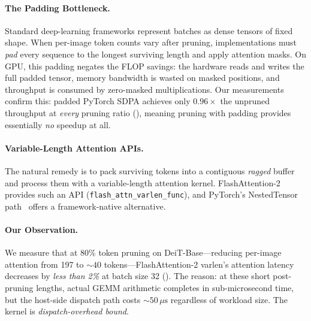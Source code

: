 \documentclass[conference]{IEEEtran}
\newcommand{\us}{\,\mu\text{s}}
\begin{document}
\paragraph{The Padding Bottleneck.}
Standard deep-learning frameworks represent batches as dense tensors
of fixed shape.
When per-image token counts vary after pruning, implementations must
\emph{pad} every sequence to the longest surviving length and apply
attention masks.
On GPU, this padding negates the FLOP savings: the hardware reads and
writes the full padded tensor, memory bandwidth is wasted on masked
positions, and throughput is consumed by zero-masked multiplications.
Our measurements confirm this: padded PyTorch SDPA achieves only
$0.96\times$ the unpruned throughput at \emph{every} pruning ratio
(), meaning pruning with padding provides
essentially \emph{no} speedup at all.

\paragraph{Variable-Length Attention APIs.}
The natural remedy is to pack surviving tokens into a contiguous
\emph{ragged} buffer and process them with a variable-length attention
kernel.
FlashAttention-2~\cite{dao2023flashattention2} provides such an API
(\texttt{flash\_attn\_varlen\_func}), and PyTorch's NestedTensor
path~\cite{pytorch2024nestedtensor} offers a framework-native
alternative.

\paragraph{Our Observation.}
We measure that at 80\% token pruning on DeiT-Base---reducing
per-image attention from 197 to ${\sim}40$ tokens---FlashAttention-2
varlen's attention latency decreases by \emph{less than 2\%} at
batch size 32 ().
The reason: at these short post-pruning lengths, actual GEMM
arithmetic completes in sub-microsecond time, but the host-side
dispatch path costs ${\sim}50\us$ regardless of workload size.
The kernel is \emph{dispatch-overhead bound}.
\end{document}
